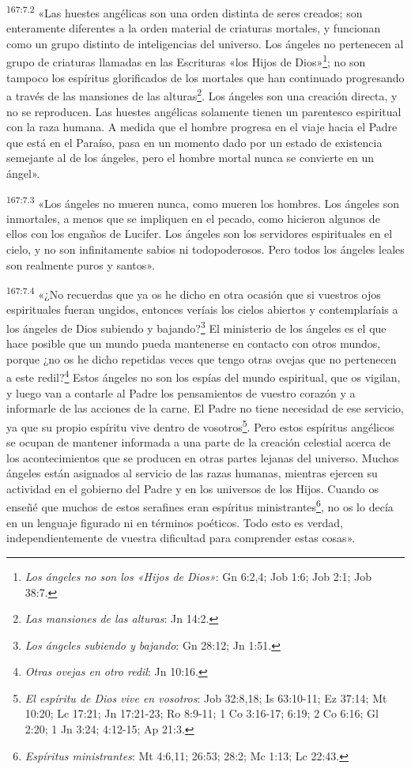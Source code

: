 \par
\textsuperscript{167:7.2} «Las huestes angélicas son una orden distinta de seres creados; son enteramente diferentes a la orden material de criaturas mortales, y funcionan como un grupo distinto de inteligencias del universo. Los ángeles no pertenecen al grupo de criaturas llamadas en las Escrituras «los Hijos de Dios»\footnote{\textit{Los ángeles no son los «Hijos de Dios»}: Gn 6:2,4; Job 1:6; Job 2:1; Job 38:7.}; no son tampoco los espíritus glorificados de los mortales que han continuado progresando a través de las mansiones de las alturas\footnote{\textit{Las mansiones de las alturas}: Jn 14:2.}. Los ángeles son una creación directa, y no se reproducen. Las huestes angélicas solamente tienen un parentesco espiritual con la raza humana. A medida que el hombre progresa en el viaje hacia el Padre que está en el Paraíso, pasa en un momento dado por un estado de existencia semejante al de los ángeles, pero el hombre mortal nunca se convierte en un ángel».

\par
\textsuperscript{167:7.3} «Los ángeles no mueren nunca, como mueren los hombres. Los ángeles son inmortales, a menos que se impliquen en el pecado, como hicieron algunos de ellos con los engaños de Lucifer. Los ángeles son los servidores espirituales en el cielo, y no son infinitamente sabios ni todopoderosos. Pero todos los ángeles leales son realmente puros y santos».

\par
\textsuperscript{167:7.4} «¿No recuerdas que ya os he dicho en otra ocasión que si vuestros ojos espirituales fueran ungidos, entonces veríais los cielos abiertos y contemplaríais a los ángeles de Dios subiendo y bajando?\footnote{\textit{Los ángeles subiendo y bajando}: Gn 28:12; Jn 1:51.} El ministerio de los ángeles es el que hace posible que un mundo pueda mantenerse en contacto con otros mundos, porque ¿no os he dicho repetidas veces que tengo otras ovejas que no pertenecen a este redil?\footnote{\textit{Otras ovejas en otro redil}: Jn 10:16.} Estos ángeles no son los espías del mundo espiritual, que os vigilan, y luego van a contarle al Padre los pensamientos de vuestro corazón y a informarle de las acciones de la carne. El Padre no tiene necesidad de ese servicio, ya que su propio espíritu vive dentro de vosotros\footnote{\textit{El espíritu de Dios vive en vosotros}: Job 32:8,18; Is 63:10-11; Ez 37:14; Mt 10:20; Lc 17:21; Jn 17:21-23; Ro 8:9-11; 1 Co 3:16-17; 6:19; 2 Co 6:16; Gl 2:20; 1 Jn 3:24; 4:12-15; Ap 21:3.}. Pero estos espíritus angélicos se ocupan de mantener informada a una parte de la creación celestial acerca de los acontecimientos que se producen en otras partes lejanas del universo. Muchos ángeles están asignados al servicio de las razas humanas, mientras ejercen su actividad en el gobierno del Padre y en los universos de los Hijos. Cuando os enseñé que muchos de estos serafines eran espíritus ministrantes\footnote{\textit{Espíritus ministrantes}: Mt 4:6,11; 26:53; 28:2; Mc 1:13; Lc 22:43.}, no os lo decía en un lenguaje figurado ni en términos poéticos. Todo esto es verdad, independientemente de vuestra dificultad para comprender estas cosas».

